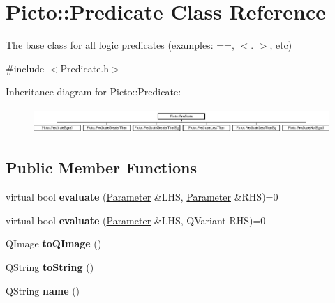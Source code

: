 \hypertarget{class_picto_1_1_predicate}{\section{Picto\-:\-:Predicate Class Reference}
\label{class_picto_1_1_predicate}
}


The base class for all logic predicates (examples\-: ==, $<$. $>$, etc)  




{\ttfamily \#include $<$Predicate.\-h$>$}

Inheritance diagram for Picto\-:\-:Predicate\-:\begin{figure}[H]
\begin{center}
\leavevmode
\includegraphics[height=0.967185cm]{class_picto_1_1_predicate}
\end{center}
\end{figure}
\subsection*{Public Member Functions}
\begin{DoxyCompactItemize}
\item 
\hypertarget{class_picto_1_1_predicate_a3e7455e7405909146f27709ceec2e382}{virtual bool {\bfseries evaluate} (\hyperlink{class_picto_1_1_parameter}{Parameter} \&L\-H\-S, \hyperlink{class_picto_1_1_parameter}{Parameter} \&R\-H\-S)=0}\label{class_picto_1_1_predicate_a3e7455e7405909146f27709ceec2e382}

\item 
\hypertarget{class_picto_1_1_predicate_a64eac4fce0318f03017a49e36cab3042}{virtual bool {\bfseries evaluate} (\hyperlink{class_picto_1_1_parameter}{Parameter} \&L\-H\-S, Q\-Variant R\-H\-S)=0}\label{class_picto_1_1_predicate_a64eac4fce0318f03017a49e36cab3042}

\item 
\hypertarget{class_picto_1_1_predicate_ae5d52556294bb5102f7d3097aab50a76}{Q\-Image {\bfseries to\-Q\-Image} ()}\label{class_picto_1_1_predicate_ae5d52556294bb5102f7d3097aab50a76}

\item 
\hypertarget{class_picto_1_1_predicate_a7a44483e0f575a84ad3fd6cea3f8a78e}{Q\-String {\bfseries to\-String} ()}\label{class_picto_1_1_predicate_a7a44483e0f575a84ad3fd6cea3f8a78e}

\item 
\hypertarget{class_picto_1_1_predicate_a75f2bde520d647e40ae3347b9870a497}{Q\-String {\bfseries name} ()}\label{class_picto_1_1_predicate_a75f2bde520d647e40ae3347b9870a497}

\end{DoxyCompactItemize}
